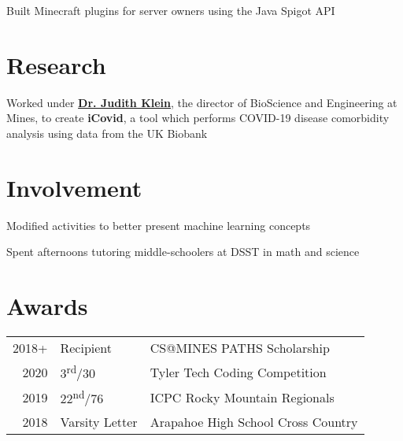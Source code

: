 \documentclass[]{darling-resume-openfont}
\begin{document}
\begin{minipage}[t]{0.66\textwidth}
\begin{tightemize}
\item Built Minecraft plugins for server owners using the Java Spigot API
\end{tightemize}
\sectionsep


\section{Research}
Worked under \textbf{\href{https://chemistry.mines.edu/project/klein-seetharaman-judith/}{Dr. Judith Klein}}, the director of BioScience and Engineering at Mines, to create \textbf{iCovid}, a tool which performs COVID-19 disease comorbidity analysis using data from the UK Biobank
\sectionsep


\section{Involvement}

\begin{tightemize}
\item Modified activities to better present machine learning concepts
\end{tightemize}
\sectionsep

\begin{tightemize}
\item Spent afternoons tutoring middle-schoolers at DSST in math and science
\end{tightemize}
\sectionsep


\section{Awards}
\begin{tabular}{rll}
2018+ & Recipient & CS@MINES PATHS Scholarship \\
2020 & 3\textsuperscript{rd}/30 & Tyler Tech Coding Competition \\
2019 & 22\textsuperscript{nd}/76 & ICPC Rocky Mountain Regionals \\
2018 & Varsity Letter & Arapahoe High School Cross Country \\
\end{tabular}
\sectionsep


\end{minipage} 
\end{document}
